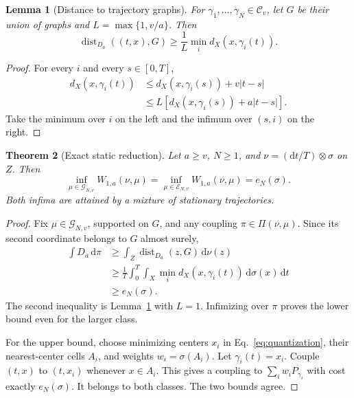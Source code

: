 \documentclass[aip,jmp,reprint,onecolumn,amsmath,amssymb]{revtex4-2}
\newcommand{\dd}{\mathrm{d}}
\newcommand{\C}{\mathcal C}
\newcommand{\G}{\mathcal G}
\newcommand{\dist}{\operatorname{dist}}
\newtheorem{theorem}{Theorem}[section]
\newtheorem{lemma}[theorem]{Lemma}
\theoremstyle{definition}
\begin{document}
\begin{lemma}[Distance to trajectory graphs]
\label{lem:distance}
For $\gamma_1,\ldots,\gamma_N\in\C_v$, let $G$ be their union of graphs and $L=\max\{1,v/a\}$. Then
\begin{equation}
 \dist_{D_a}((t,x),G)\ge\frac1L\min_i d_X(x,\gamma_i(t)).
 \label{eq:distance}
\end{equation}
\end{lemma}
\begin{proof}
For every $i$ and every $s\in[0,T]$,
\begin{align}
 d_X(x,\gamma_i(t))
 &\le d_X(x,\gamma_i(s))+v|t-s|\\
 &\le L[d_X(x,\gamma_i(s))+a|t-s|].
\end{align}
Take the minimum over $i$ on the left and the infimum over $(s,i)$ on the right.
\end{proof}

\begin{theorem}[Exact static reduction]
\label{thm:static}
Let $a\ge v$, $N\ge1$, and $\nu=(\dd t/T)\otimes\sigma$ on $Z$. Then
\begin{equation}
 \inf_{\mu\in\G_{N,v}}W_{1,a}(\nu,\mu)
 =\inf_{\mu\in\mathcal E_{N,v}}W_{1,a}(\nu,\mu)
 =e_N(\sigma).
 \label{eq:main}
\end{equation}
Both infima are attained by a mixture of stationary trajectories.
\end{theorem}
\begin{proof}
Fix $\mu\in\G_{N,v}$, supported on $G$, and any coupling $\pi\in\Pi(\nu,\mu)$. Since its second coordinate belongs to $G$ almost surely,
\begin{align}
 \int D_a\,\dd\pi
 &\ge\int_Z\dist_{D_a}(z,G)\,\dd\nu(z)\\
 &\ge\frac1T\int_0^T\int_X\min_i d_X(x,\gamma_i(t))\,\dd\sigma(x)\,\dd t\\
 &\ge e_N(\sigma).
\end{align}
The second inequality is Lemma~\ref{lem:distance} with $L=1$. Infimizing over $\pi$ proves the lower bound even for the larger class.

For the upper bound, choose minimizing centers $x_i$ in Eq.~\eqref{eq:quantization}, their nearest-center cells $A_i$, and weights $w_i=\sigma(A_i)$. Let $\gamma_i(t)=x_i$. Couple $(t,x)$ to $(t,x_i)$ whenever $x\in A_i$. This gives a coupling to $\sum_iw_iP_{\gamma_i}$ with cost exactly $e_N(\sigma)$. It belongs to both classes. The two bounds agree.
\end{proof}
\end{document}
